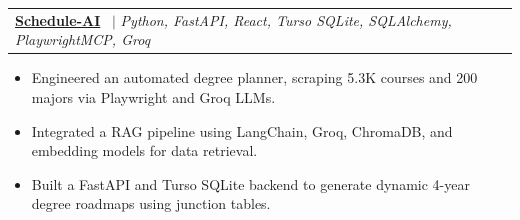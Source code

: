 \documentclass[letterpaper,11pt]{article}
\makeatletter
\newcommand{\resumeItem}[1]{
  \item\small{
    {#1 \vspace{-2pt}}
  }
}
\newcommand{\resumeProjectHeading}[2]{
    \item
    \begin{tabular*}{0.97\textwidth}{l@{\extracolsep{\fill}}r}
      \small#1 & #2 \\
    \end{tabular*}\vspace{-7pt}
}
\newcommand{\resumeItemListStart}{\begin{itemize}}
\newcommand{\resumeItemListEnd}{\end{itemize}\vspace{-5pt}}
\makeatother
\begin{document}
\resumeProjectHeading
{\textbf{\href{https://github.com/epicgdog/schedule-ai}{Schedule-AI}} \ $|$ \emph{Python, FastAPI, React, Turso SQLite, SQLAlchemy, PlaywrightMCP, Groq}}{}
\resumeItemListStart
\resumeItem{Engineered an automated degree planner, scraping 5.3K courses and 200 majors via Playwright and Groq LLMs.}
\resumeItem{Integrated a RAG pipeline using LangChain, Groq, ChromaDB, and embedding models for data retrieval.}
\resumeItem{Built a FastAPI and Turso SQLite backend to generate dynamic 4-year degree roadmaps using junction tables.}
\resumeItemListEnd




\end{document}
